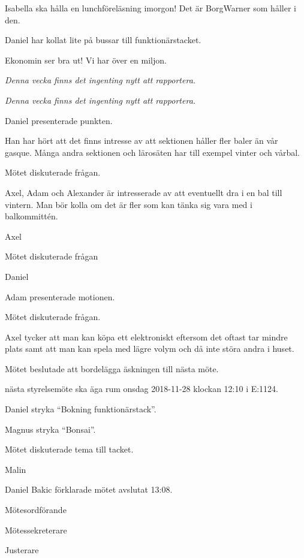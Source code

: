 \documentclass[10pt]{article}
\def\mo{Daniel Bakic}
\def\ms{Axel Voss}
\def\ji{Alexander Wik}
\begin{document}
\begin{paragrafer}
\begin{paragrafer}
		Isabella ska hålla en lunchföreläsning imorgon! Det är BorgWarner som håller i den.

		Daniel har kollat lite på bussar till funktionärstacket.


		Ekonomin ser bra ut! Vi har över en miljon. 


		\emph{Denna vecka finns det ingenting nytt att rapportera. }


		\emph{Denna vecka finns det ingenting nytt att rapportera. }

	\end{paragrafer}

	Daniel presenterade punkten.
	
	Han har hört att det finns intresse av att sektionen håller fler baler än vår gasque. Många andra sektionen och lärosäten har till exempel vinter och vårbal.

	Mötet diskuterade frågan.

	Axel, Adam och Alexander är intresserade av att eventuellt dra i en bal till vintern. Man bör kolla om det är fler som kan tänka sig vara med i balkommittén.
	
	Axel 


	Mötet diskuterade frågan

	Daniel 


	Adam presenterade motionen. 

	Mötet diskuterade frågan.

	Axel tycker att man kan köpa ett elektroniskt eftersom det oftast tar mindre plats samt att man kan spela med lägre volym och då inte störa andra i huset.

	Mötet beslutade att bordelägga äskningen till nästa möte. 


	\Mba nästa styrelsemöte ska äga rum onsdag 2018-11-28 klockan 12:10 i E:1124.


	Daniel \ypa stryka ``Bokning funktionärstack''.

	\Mbaby

	Magnus \ypa stryka ``Bonsai''.

	\Mbaby


	Mötet diskuterade tema till tacket. 

	Malin 

	
	{\mo} förklarade mötet avslutat 13:08.

\end{paragrafer}

\hidesignfoot
\begin{signatures}{3}
	\signature{\mo}{Mötesordförande}
	\signature{\ms}{Mötessekreterare}
	\signature{\ji}{Justerare}
\end{signatures}
\end{document}
